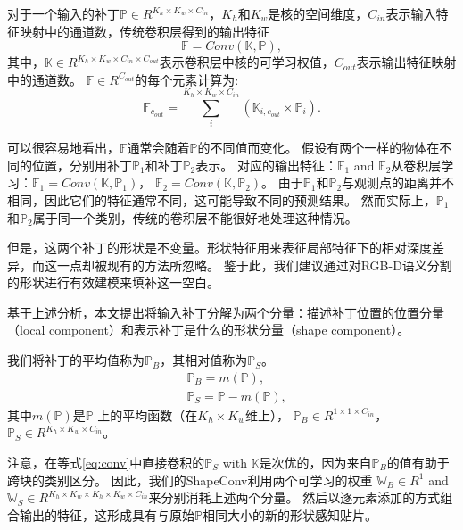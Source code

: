 对于一个输入的补丁$\mathbb{P} \in R^{K_h \times K_w \times C_{in}}$，$K_h$和$K_w$是核的空间维度，$C_{in}$表示输入特征映射中的通道数，传统卷积层得到的输出特征
\begin{equation}
	\label{eq:conv}
	\mathbb{F} = Conv(\mathbb{K}, \mathbb{P}),
\end{equation}
其中，$\mathbb{K} \in R^{K_h \times K_w \times C_{in} \times C_{out}}$表示卷积层中核的可学习权值，$C_{out}$表示输出特征映射中的通道数。
$\mathbb{F} \in R^{C_{out}}$的每个元素计算为:
\begin{equation*}
	\mathbb{F}_{c_{out}} = \sum_{i}^{K_h \times K_w \times C_{in}} (\mathbb{K}_{i,c_{out}} \times \mathbb{P}_i).
	\label{eq:conv-f}
\end{equation*}

可以很容易地看出，$\mathbb{F}$通常会随着$\mathbb{P}$的不同值而变化。
假设有两个一样的物体在不同的位置，分别用补丁$\mathbb{P}_1$和补丁$\mathbb{P}_2$表示。
对应的输出特征：$\mathbb{F}_1$ and $\mathbb{F}_2$从卷积层学习：$\mathbb{F}_1 = Conv(\mathbb{K}, \mathbb{P}_1)$， $\mathbb{F}_2 = Conv(\mathbb{K}, \mathbb{P}_2)$。
由于$\mathbb{P}_1$和$\mathbb{P}_2$与观测点的距离并不相同，因此它们的特征通常不同，这可能导致不同的预测结果。
然而实际上，$\mathbb{P}_1$和$\mathbb{P}_2$属于同一个类别，传统的卷积层不能很好地处理这种情况。

但是，这两个补丁的形状是不变量。形状特征用来表征局部特征下的相对深度差异，而这一点却被现有的方法所忽略。
鉴于此，我们建议通过对RGB-D语义分割的形状进行有效建模来填补这一空白。

基于上述分析，本文提出将输入补丁分解为两个分量：描述补丁位置的位置分量（local component）和表示补丁是什么的形状分量（shape component）。

我们将补丁的平均值称为$\mathbb{P}_B$，其相对值称为$\mathbb{P}_S$。
\begin{equation*}
	\begin{aligned}
		& \mathbb{P}_B = m(\mathbb{P}), \\
		& \mathbb{P}_S = \mathbb{P} - m(\mathbb{P}),
	\end{aligned}
\end{equation*}
其中$m(\mathbb{P})$是$\mathbb{P}$ 上的平均函数（在$K_h \times K_w$维上），
$\mathbb{P}_B \in R^{1 \times 1 \times C_{in}}$，$\mathbb{P}_S \in R^{K_h \times K_w \times C_{in}}$。


注意，在等式\ref{eq:conv}中直接卷积的$\mathbb{P}_S$ with $\mathbb{K}$是次优的，因为来自$\mathbb{P}_B$的值有助于跨块的类别区分。
因此，我们的ShapeConv利用两个可学习的权重 $\mathbb{W}_B \in R^{1}$ and $\mathbb{W}_S \in R^{K_h \times K_w \times K_h \times K_w \times C_{in}}$来分别消耗上述两个分量。
然后以逐元素添加的方式组合输出的特征，这形成具有与原始$\mathbb{P}$相同大小的新的形状感知贴片。

